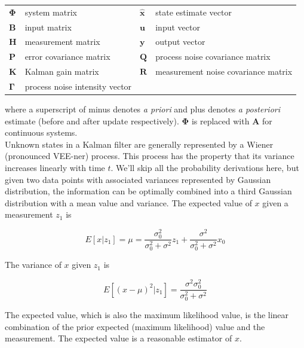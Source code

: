 \documentclass[10pt,conference,compsoc]{IEEEtran}
\newcommand{\mtx}[1] {\bm #1}
\begin{document}
\begin{table}[ht]
  \renewcommand{\arraystretch}{1.3}
  \centering
  \begin{tabulary}{\linewidth}{LLLL}
    $\mtx{\Phi}$ & system matrix &
      $\hat{\mtx{x}}$ & state estimate vector \\
    $\mtx{B}$ & input matrix            & $\mtx{u}$ & input vector \\
    $\mtx{H}$ & measurement matrix      & $\mtx{y}$ & output vector \\
    $\mtx{P}$ & error covariance matrix &
      $\mtx{Q}$ & process noise covariance matrix \\
    $\mtx{K}$ & Kalman gain matrix &
      $\mtx{R}$ & measurement noise covariance matrix \\
    $\mtx{\Gamma}$ & process noise intensity vector &
  \end{tabulary}
  \label{tab:kalman_def}
\end{table}

\noindent where a superscript of minus denotes \textit{a priori} and plus
denotes \textit{a posteriori} estimate (before and after update respectively).
$\mtx{\Phi}$ is replaced with $\mtx{A}$ for continuous systems. \\

\noindent Unknown states in a Kalman filter are generally represented by a
Wiener (pronounced VEE-ner) process. This process has the property that its
variance increases linearly with time $t$. We'll skip all the probability
derivations here, but given two data points with associated variances
represented by Gaussian distribution, the information can be optimally combined
into a third Gaussian distribution with a mean value and variance. The expected
value of $x$ given a measurement $z_1$ is

\begin{equation}
  E[x|z_1] = \mu = \frac{\sigma_0^2}{\sigma_0^2 + \sigma^2}z_1 +
    \frac{\sigma^2}{\sigma_0^2 + \sigma^2}x_0
\end{equation}

\noindent The variance of $x$ given $z_1$ is

\begin{equation}
  E[(x - \mu)^2|z_1] = \frac{\sigma^2 \sigma_0^2}{\sigma_0^2 + \sigma^2}
\end{equation}

\noindent The expected value, which is also the maximum likelihood value, is the
linear combination of the prior expected (maximum likelihood) value and the
measurement. The expected value is a reasonable estimator of $x$.
\end{document}
